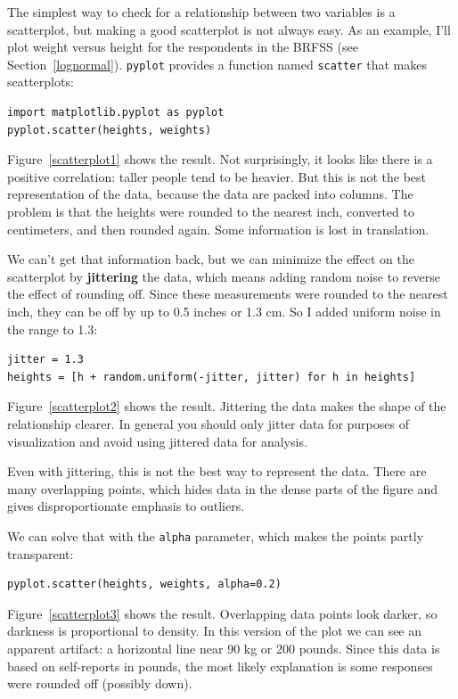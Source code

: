\documentclass[12pt]{book}
\begin{document}
The simplest way to check for a relationship between two variables
is a scatterplot, but making a good scatterplot is not always easy.
As an example, I'll plot weight versus height for the respondents
in the BRFSS (see Section~\ref{lognormal}).  {\tt pyplot} provides
a function named {\tt scatter} that makes scatterplots:
%
\begin{verbatim}
import matplotlib.pyplot as pyplot
pyplot.scatter(heights, weights)
\end{verbatim}

Figure~\ref{scatterplot1} shows the result.  Not surprisingly, it
looks like there is a positive correlation: taller people tend to be
heavier.  But this is not the best representation of the data, because
the data are packed into columns.  The problem is that the heights
were rounded to the nearest inch, converted to centimeters, and
then rounded again.  Some information is lost in translation.

We can't get that information back, but we can minimize the effect on
the scatterplot by {\bf jittering} the data, which means adding random
noise to reverse the effect of rounding off.  Since these measurements
were rounded to the nearest inch, they can be off by up to 0.5 inches or
1.3 cm.  So I added uniform noise in the range  to 1.3:
%
\begin{verbatim}
jitter = 1.3
heights = [h + random.uniform(-jitter, jitter) for h in heights]
\end{verbatim}

Figure~\ref{scatterplot2} shows the result.  Jittering the data makes
the shape of the relationship clearer.  In general you should only jitter
data for purposes of visualization and avoid using jittered data
for analysis.

Even with jittering, this is not the best way to represent the data.
There are many overlapping points, which hides data
in the dense parts of the figure and gives disproportionate emphasis
to outliers.

We can solve that with the {\tt alpha} parameter, which makes
the points partly transparent:
%
\begin{verbatim}
pyplot.scatter(heights, weights, alpha=0.2)
\end{verbatim}
%
Figure~\ref{scatterplot3} shows the result.  Overlapping data
points look darker, so darkness is proportional to density.  In this
version of the plot we can see an apparent artifact: a horizontal line
near 90 kg or 200 pounds.  Since this data is based on self-reports in
pounds, the most likely explanation is some responses were rounded off
(possibly down).
\end{document}
